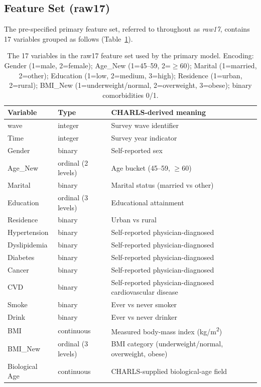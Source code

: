 \documentclass[11pt,a4paper]{article}
\begin{document}
\subsection{Feature Set (raw17)}
The pre-specified primary feature set, referred to throughout as \emph{raw17}, contains 17 variables grouped as follows (Table~\ref{tab:raw17}).

\begin{table}[h!]
\centering
\small
\caption{The 17 variables in the raw17 feature set used by the primary model. Encoding: Gender (1=male, 2=female); Age\_New (1=45--59, 2=$\geq 60$); Marital (1=married, 2=other); Education (1=low, 2=medium, 3=high); Residence (1=urban, 2=rural); BMI\_New (1=underweight/normal, 2=overweight, 3=obese); binary comorbidities 0/1.}
\label{tab:raw17}
\begin{tabular}{llp{6.2cm}}
\toprule
Variable & Type & CHARLS-derived meaning \\
\midrule
wave & integer & Survey wave identifier \\
Time & integer & Survey year indicator \\
Gender & binary & Self-reported sex \\
Age\_New & ordinal (2 levels) & Age bucket (45--59, $\geq 60$) \\
Marital & binary & Marital status (married vs other) \\
Education & ordinal (3 levels) & Educational attainment \\
Residence & binary & Urban vs rural \\
Hypertension & binary & Self-reported physician-diagnosed \\
Dyslipidemia & binary & Self-reported physician-diagnosed \\
Diabetes & binary & Self-reported physician-diagnosed \\
Cancer & binary & Self-reported physician-diagnosed \\
CVD & binary & Self-reported physician-diagnosed cardiovascular disease \\
Smoke & binary & Ever vs never smoker \\
Drink & binary & Ever vs never drinker \\
BMI & continuous & Measured body-mass index (kg/m\textsuperscript{2}) \\
BMI\_New & ordinal (3 levels) & BMI category (underweight/normal, overweight, obese) \\
Biological Age & continuous & CHARLS-supplied biological-age field \\
\bottomrule
\end{tabular}
\end{table}
\end{document}
